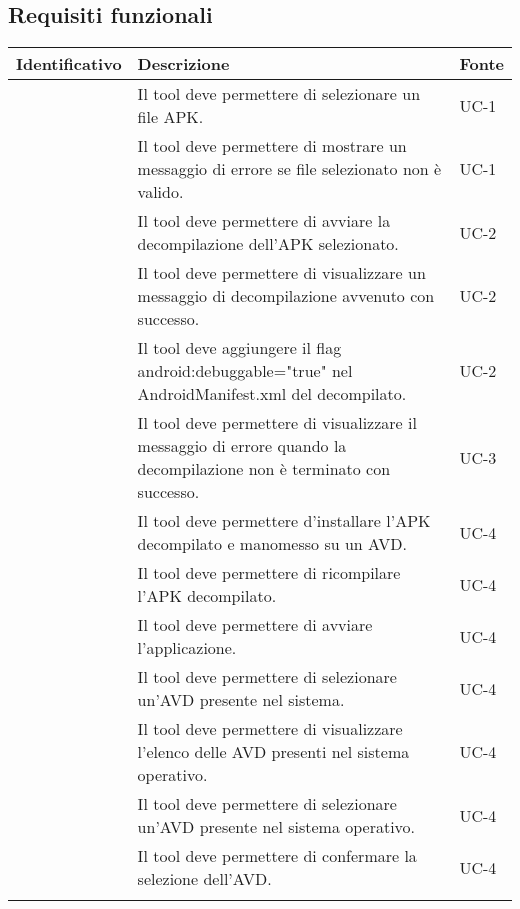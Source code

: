 \subsection{Requisiti funzionali}\label{subsec:requisiti-funzionali}
\begin{center}
    \begin{longtable}{ | c| C{7cm} |C{3cm} |}
        \hline
        \textbf{Identificativo} & \textbf{Descrizione} &\textbf{Fonte}\\\hline
         & Il tool deve permettere di selezionare un file APK.& UC-1\\\hline
         & Il tool deve permettere di mostrare un messaggio di errore se file selezionato non è valido.& UC-1\\\hline
        \setcounter{subCount}{0}

         & Il tool deve permettere di avviare la decompilazione dell'APK selezionato.& UC-2\\\hline
         & Il tool deve permettere di visualizzare un messaggio di decompilazione avvenuto con successo.& UC-2\\\hline
         & Il tool deve aggiungere il flag android:debuggable="true" nel AndroidManifest.xml del decompilato.& UC-2\\\hline
        \setcounter{subCount}{0}

         & Il tool deve permettere di visualizzare il messaggio di errore quando la decompilazione non è terminato con successo.& UC-3\\\hline
         & Il tool deve permettere d'installare l'APK decompilato e manomesso su un AVD. & UC-4 \\\hline
         & Il tool deve permettere di ricompilare l'APK decompilato.& UC-4\\\hline
         & Il tool deve permettere di avviare l'applicazione.& UC-4\\\hline

         & Il tool deve permettere di selezionare un'AVD presente nel sistema.& UC-4 \\\hline
         & Il tool deve permettere di visualizzare l'elenco delle AVD presenti nel sistema operativo.& UC-4\\\hline
         & Il tool deve permettere di selezionare un'AVD presente nel sistema operativo.& UC-4\\\hline
         & Il tool deve permettere di confermare la selezione dell'AVD.& UC-4\\\hline
        \setcounter{subCount}{0}


\end{longtable}
\end{center}

